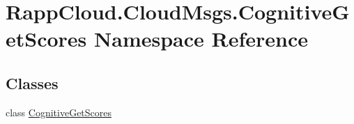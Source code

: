 \hypertarget{namespaceRappCloud_1_1CloudMsgs_1_1CognitiveGetScores}{\section{Rapp\-Cloud.\-Cloud\-Msgs.\-Cognitive\-Get\-Scores Namespace Reference}
\label{namespaceRappCloud_1_1CloudMsgs_1_1CognitiveGetScores}
}
\subsection*{Classes}
\begin{DoxyCompactItemize}
\item 
class \hyperlink{classRappCloud_1_1CloudMsgs_1_1CognitiveGetScores_1_1CognitiveGetScores}{Cognitive\-Get\-Scores}
\end{DoxyCompactItemize}
